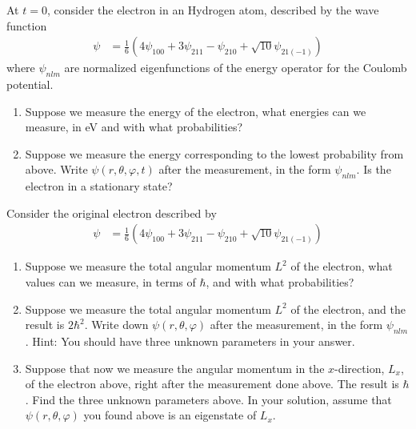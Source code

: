 \documentclass[fleqn, a4paper, 11pt, oneside]{amsart}
\theoremstyle{definition}
\theoremstyle{theorem}
\begin{document}
\begin{question}
	At $t = 0$, consider the electron in an Hydrogen atom, described by the wave function
	\begin{align*}
		\psi & = \frac{1}{6} \left( 4 \psi_{1 0 0} + 3 \psi_{2 1 1} - \psi_{2 1 0} + \sqrt{10} \psi_{2 1 (-1)} \right)
	\end{align*}
	where $\psi_{n l m}$ are normalized eigenfunctions of the energy operator for the Coulomb potential.
	\begin{enumerate}
		\item
			Suppose we measure the energy of the electron, what energies can we measure, in \si{\electronvolt} and with what probabilities?
		\item
			Suppose we measure the energy corresponding to the lowest probability from above.
			Write $\psi(r,\theta,\varphi,t)$ after the measurement, in the form $\psi_{n l m}$.
			Is the electron in a stationary state?
	\end{enumerate}
	Consider the original electron described by
	\begin{align*}
		\psi & = \frac{1}{6} \left( 4 \psi_{1 0 0} + 3 \psi_{2 1 1} - \psi_{2 1 0} + \sqrt{10} \psi_{2 1 (-1)} \right)
	\end{align*}
	\begin{enumerate}[resume]
		\item
			Suppose we measure the total angular momentum $L^2$ of the electron, what values can we measure, in terms of $\hbar$, and with what probabilities?
		\item
			Suppose we measure the total angular momentum $L^2$ of the electron, and the result is $2 \hbar^2$.
			Write down $\psi(r,\theta,\varphi)$ after the measurement, in the form $\psi_{n l m}$.
			Hint: You should have three unknown parameters in your answer.
		\item
			Suppose that now we measure the angular momentum in the $x$-direction, $L_x$, of the electron above, right after the measurement done above.
			The result is $\hbar$.
			Find the three unknown parameters above.
			In your solution, assume that $\psi(r,\theta,\varphi)$ you found above is an eigenstate of $L_x$.
	\end{enumerate}
\end{question}
\end{document}
